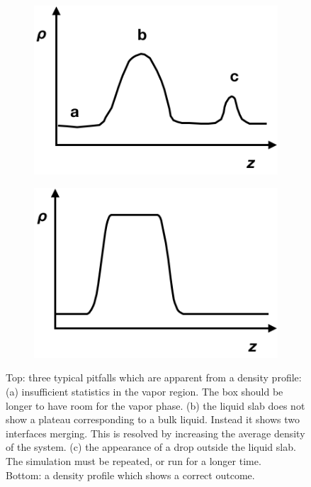 \documentclass[9pt,bestpractices]{livecoms}
\begin{document}
\begin{figure}
	\centering
	\begin{subfigure}{0.3\textwidth} %
    \includegraphics[width=1\textwidth]{gfx/image20.png}
	\end{subfigure}
	\begin{subfigure}{0.3\textwidth} %
    \includegraphics[width=1\textwidth]{gfx/image21.png}
	\end{subfigure}
  \caption{
    Top: three typical pitfalls which are apparent from a density profile:
    (a) insufficient statistics in the vapor region. The box should be longer to have room for the vapor phase. 
    (b) the liquid slab does not show a plateau corresponding to a bulk liquid. Instead it shows two interfaces merging. This is resolved by increasing the average density of the system.
    (c) the appearance of a drop outside the liquid slab. The simulation must be repeated, or run for a longer time.\\
    Bottom: a density profile which shows a correct outcome.
  }
\label{fig:7b}
\end{figure}
\end{document}
